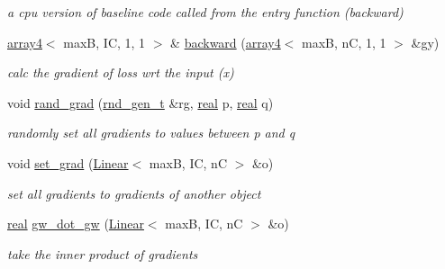 \begin{DoxyCompactItemize}
\begin{DoxyCompactList}\small\item\em a cpu version of baseline code called from the entry function (backward) \end{DoxyCompactList}\item 
\hyperlink{structarray4}{array4}$<$ maxB, IC, 1, 1 $>$ \& \hyperlink{structLinear_aeaa39d38b876fbd70794621955193fd3}{backward} (\hyperlink{structarray4}{array4}$<$ maxB, nC, 1, 1 $>$ \&gy)
\begin{DoxyCompactList}\small\item\em calc the gradient of loss wrt the input (x) \end{DoxyCompactList}\item 
void \hyperlink{structLinear_aab38b786325b4701080a89d5dab96f23}{rand\+\_\+grad} (\hyperlink{structrnd__gen__t}{rnd\+\_\+gen\+\_\+t} \&rg, \hyperlink{vgg__util_8h_a1082d08aaa761215ec83e7149f27ad16}{real} p, \hyperlink{vgg__util_8h_a1082d08aaa761215ec83e7149f27ad16}{real} q)
\begin{DoxyCompactList}\small\item\em randomly set all gradients to values between p and q \end{DoxyCompactList}\item 
void \hyperlink{structLinear_a4faa818e70d779b80663b361a1e7ef75}{set\+\_\+grad} (\hyperlink{structLinear}{Linear}$<$ maxB, IC, nC $>$ \&o)
\begin{DoxyCompactList}\small\item\em set all gradients to gradients of another object \end{DoxyCompactList}\item 
\hyperlink{vgg__util_8h_a1082d08aaa761215ec83e7149f27ad16}{real} \hyperlink{structLinear_af920adb0c630cddb4f8012984784807c}{gw\+\_\+dot\+\_\+gw} (\hyperlink{structLinear}{Linear}$<$ maxB, IC, nC $>$ \&o)
\begin{DoxyCompactList}\small\item\em take the inner product of gradients \end{DoxyCompactList}\end{DoxyCompactItemize}
